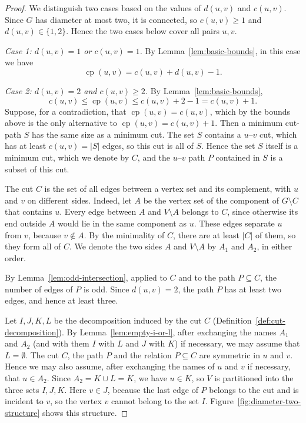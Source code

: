 \documentclass[a4paper,fleqn]{cas-sc}
\numberwithin{equation}{section}
\theoremstyle{definition}
\theoremstyle{plain}
\theoremstyle{remark}
\newcommand{\cp}{\operatorname{cp}}                  %
\begin{document}
\begin{proof}
We distinguish two cases based on the values of $d(u, v)$ and $c(u, v)$.
Since $G$ has diameter at most two, it is connected, so $c(u, v) \geq 1$ and $d(u, v) \in \{1, 2\}$.
Hence the two cases below cover all pairs $u, v$.

\emph{Case 1: $d(u, v) = 1$ or $c(u, v) = 1$.}
By Lemma~\ref{lem:basic-bounds}, in this case we have
\[
\cp(u, v) = c(u, v) + d(u, v) - 1.
\]

\emph{Case 2: $d(u, v) = 2$ and $c(u, v) \geq 2$.}
By Lemma~\ref{lem:basic-bounds},
\[
c(u, v) \leq \cp(u, v) \leq c(u, v) + 2 - 1 = c(u, v) + 1.
\]
Suppose, for a contradiction, that $\cp(u, v) = c(u, v)$, which by the bounds above is the only alternative to $\cp(u, v) = c(u, v) + 1$.
Then a minimum cut-path $S$ has the same size as a minimum cut.
The set $S$ contains a $u$--$v$ cut, which has at least $c(u, v) = |S|$ edges, so this cut is all of $S$.
Hence the set $S$ itself is a minimum cut, which we denote by $C$, and the $u$--$v$ path $P$ contained in $S$ is a subset of this cut.

The cut $C$ is the set of all edges between a vertex set and its complement, with $u$ and $v$ on different sides.
Indeed, let $A$ be the vertex set of the component of $G \setminus C$ that contains $u$.
Every edge between $A$ and $V \setminus A$ belongs to $C$, since otherwise its end outside $A$ would lie in the same component as $u$.
These edges separate $u$ from $v$, because $v \notin A$.
By the minimality of $C$, there are at least $|C|$ of them, so they form all of $C$.
We denote the two sides $A$ and $V \setminus A$ by $A_1$ and $A_2$, in either order.

By Lemma~\ref{lem:odd-intersection}, applied to $C$ and to the path $P \subseteq C$, the number of edges of $P$ is odd.
Since $d(u,v) = 2$, the path $P$ has at least two edges, and hence at least three.

Let $I, J, K, L$ be the decomposition induced by the cut $C$ (Definition~\ref{def:cut-decomposition}).
By Lemma~\ref{lem:empty-i-or-l}, after exchanging the names $A_1$ and $A_2$ (and with them $I$ with $L$ and $J$ with $K$) if necessary, we may assume that $L = \emptyset$.
The cut $C$, the path $P$ and the relation $P \subseteq C$ are symmetric in $u$ and $v$.
Hence we may also assume, after exchanging the names of $u$ and $v$ if necessary, that $u \in A_2$.
Since $A_2 = K \cup L = K$, we have $u \in K$, so $V$ is partitioned into the three sets $I, J, K$.
Here $v \in J$, because the last edge of $P$ belongs to the cut and is incident to $v$, so the vertex $v$ cannot belong to the set $I$.
Figure~\ref{fig:diameter-two-structure} shows this structure.


\end{proof}
\end{document}
